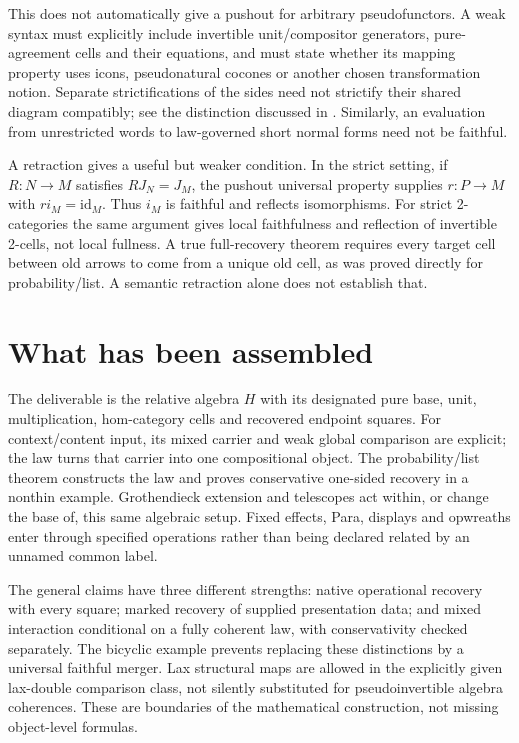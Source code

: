 \documentclass[11pt]{article}
\theoremstyle{definition}
\newcommand{\id}{\mathrm{id}}
\begin{document}
This does not automatically give a pushout for arbitrary pseudofunctors.
A weak syntax must explicitly include invertible unit/compositor generators,
pure-agreement cells and their equations, and must state whether its
mapping property uses icons, pseudonatural cocones or another chosen
transformation notion. Separate strictifications of the sides need not
strictify their shared diagram compatibly; see the distinction discussed in
\cite{LackCompanion}. Similarly, an evaluation from unrestricted words to
law-governed short normal forms need not be faithful.

A retraction gives a useful but weaker condition. In the strict setting, if
$R:N\to M$ satisfies $RJ_N=J_M$, the pushout universal property supplies
$r:P\to M$ with $ri_M=\id_M$. Thus $i_M$ is faithful and reflects
isomorphisms. For strict 2-categories the same argument gives local
faithfulness and reflection of invertible 2-cells, not local fullness.
A true full-recovery theorem requires every target cell between old arrows
to come from a unique old cell, as was proved directly for
probability/list. A semantic retraction alone does not establish that.

\section{What has been assembled}

The deliverable is the relative algebra $H$ with its designated pure base,
unit, multiplication, hom-category cells and recovered endpoint squares.
For context/content input, its mixed carrier and weak global comparison are
explicit; the law turns that carrier into one compositional object. The
probability/list theorem constructs the law and proves conservative
one-sided recovery in a nonthin example. Grothendieck extension and
telescopes act within, or change the base of, this same algebraic setup.
Fixed effects, Para, displays and opwreaths enter through specified
operations rather than being declared related by an unnamed common label.

The general claims have three different strengths: native operational
recovery with every square; marked recovery of supplied presentation data;
and mixed interaction conditional on a fully coherent law, with
conservativity checked separately. The bicyclic example prevents replacing
these distinctions by a universal faithful merger. Lax structural maps are
allowed in the explicitly given lax-double comparison class, not silently
substituted for pseudoinvertible algebra coherences. These are boundaries
of the mathematical construction, not missing object-level formulas.
\end{document}
